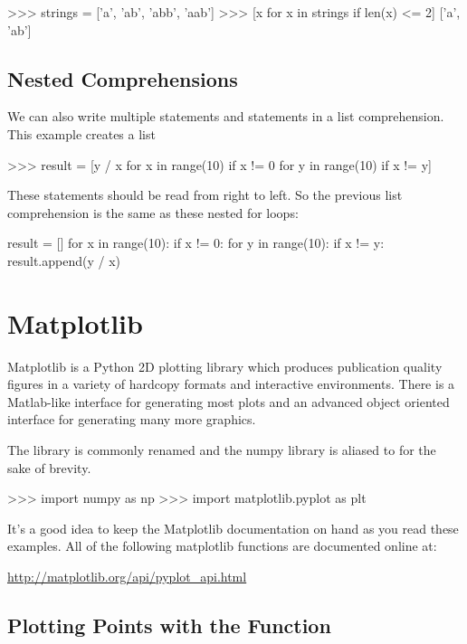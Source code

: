 \documentclass[11pt]{cselabheader}
\begin{document}
\begin{pyconcode}
>>> strings = ['a', 'ab', 'abb', 'aab']
>>> [x for x in strings if len(x) <= 2]
['a', 'ab']
\end{pyconcode}

\subsection{Nested Comprehensions}
We can also write multiple  statements and
 statements in a list comprehension.
This example creates a list

\begin{pyconcode}
>>> result = [y / x for x in range(10) if x != 0 for y in range(10) if x != y]
\end{pyconcode}

These statements should be read from right to left. So the previous list
comprehension is the same as these nested for loops:

\begin{python3code}
result = []
for x in range(10):
    if x != 0:
        for y in range(10):
            if x != y:
                result.append(y / x)
\end{python3code}

\section{Matplotlib}
Matplotlib is a Python 2D plotting library which produces publication quality
figures in a variety of hardcopy formats and interactive environments.
There is a Matlab-like interface for generating most plots and an advanced
object oriented interface for generating many more graphics.

The  library is commonly renamed
 and the numpy library is aliased to
 for the sake of brevity.
\begin{pyconcode}
>>> import numpy as np
>>> import matplotlib.pyplot as plt
\end{pyconcode}

It's a good idea to keep the Matplotlib documentation on hand as you read these
examples. All of the following matplotlib functions are documented online at:
\begin{center}
\url{http://matplotlib.org/api/pyplot_api.html}
\end{center}

\subsection{Plotting Points with the  Function}
\end{document}
